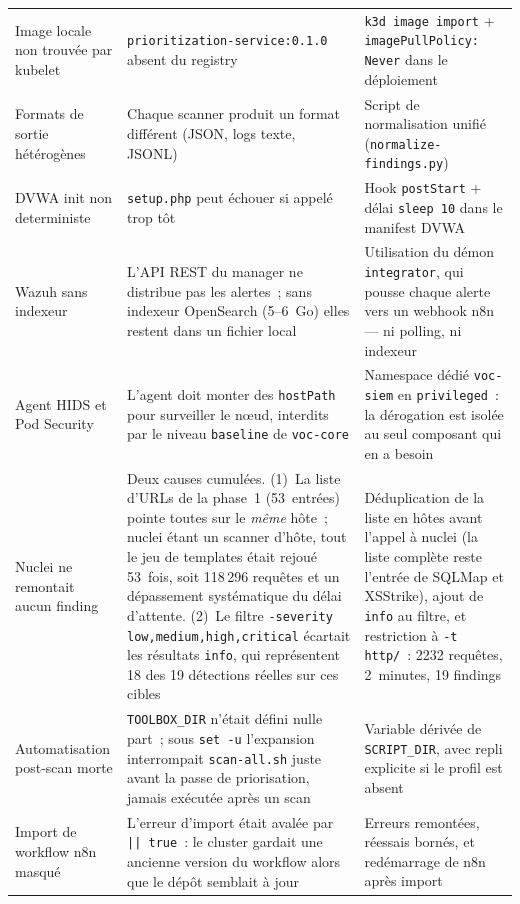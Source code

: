 \documentclass[12pt,a4paper]{report}
\begin{document}
\begin{longtable}{L{3.2cm} L{5.8cm} L{5.8cm}}
\addlinespace
Image locale non trouvée par kubelet & \texttt{prioritization-service:0.1.0} absent du registry & \texttt{k3d image import} + \texttt{imagePullPolicy: Never} dans le déploiement \\
\addlinespace
Formats de sortie hétérogènes & Chaque scanner produit un format différent (JSON, logs texte, JSONL) & Script de normalisation unifié (\texttt{normalize-findings.py}) \\
\addlinespace
DVWA init non deterministe & \texttt{setup.php} peut échouer si appelé trop tôt & Hook \texttt{postStart} + délai \texttt{sleep 10} dans le manifest DVWA \\
\addlinespace
Wazuh sans indexeur & L'API REST du manager ne distribue pas les alertes~; sans indexeur OpenSearch (5--6~Go) elles restent dans un fichier local & Utilisation du démon \texttt{integrator}, qui pousse chaque alerte vers un webhook n8n --- ni polling, ni indexeur \\
\addlinespace
Agent HIDS et Pod Security & L'agent doit monter des \texttt{hostPath} pour surveiller le nœud, interdits par le niveau \texttt{baseline} de \texttt{voc-core} & Namespace dédié \texttt{voc-siem} en \texttt{privileged}~: la dérogation est isolée au seul composant qui en a besoin \\
\addlinespace
Nuclei ne remontait aucun finding & Deux causes cumulées. (1)~La liste d'URLs de la phase~1 (53~entrées) pointe toutes sur le \emph{même} hôte~; nuclei étant un scanner d'hôte, tout le jeu de templates était rejoué 53~fois, soit 118\,296 requêtes et un dépassement systématique du délai d'attente. (2)~Le filtre \texttt{-severity low,medium,high,critical} écartait les résultats \texttt{info}, qui représentent 18 des 19 détections réelles sur ces cibles & Déduplication de la liste en hôtes avant l'appel à nuclei (la liste complète reste l'entrée de SQLMap et XSStrike), ajout de \texttt{info} au filtre, et restriction à \texttt{-t http/}~: 2232 requêtes, 2~minutes, 19 findings \\
\addlinespace
Automatisation post-scan morte & \texttt{TOOLBOX\_DIR} n'était défini nulle part~; sous \texttt{set -u} l'expansion interrompait \texttt{scan-all.sh} juste avant la passe de priorisation, jamais exécutée après un scan & Variable dérivée de \texttt{SCRIPT\_DIR}, avec repli explicite si le profil est absent \\
\addlinespace
Import de workflow n8n masqué & L'erreur d'import était avalée par \texttt{|| true}~: le cluster gardait une ancienne version du workflow alors que le dépôt semblait à jour & Erreurs remontées, réessais bornés, et redémarrage de n8n après import \\
\end{longtable}
\normalsize
\end{document}
